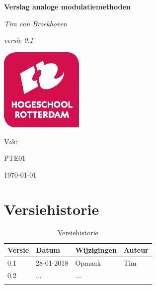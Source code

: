 \documentclass[11pt,a4paper]{article}
\def\auteur{Tim van Broekhoven}
\def\titel{Verslag analoge modulatiemethoden}
\def\datum{\today}
\def\versie{0.1}
\def\subtitel{}
\begin{document}
	
	\begin{titlepage}	
		\centering
		{\huge\bfseries \titel \par}
		{\huge\itshape \subtitel \par}
		\vspace{1cm}
		{\Large\itshape \auteur \par}
		\vspace{1cm}
		{\Large\itshape versie \versie\par}	
		\vfill
		\includegraphics[width=0.30\textwidth]{hr-logo}\par\vspace{1cm}
		Vak:\par
		PTE01
		
		\vfill
		{\large \datum \par}
	\end{titlepage}
	
	\tableofcontents
	
	\clearpage
	
	\listoffigures
	
	\clearpage
	\listoftables
	
	\clearpage
	
	\section{Versiehistorie}
	\begin{table}[H]
		\centering
		\label{Versiehistorie}
		\begin{tabular}{|p{1cm}|p{2cm}|p{6cm}|p{2cm}|}
			\hline
			\rowcolor[HTML]{FFCC67}
			\textbf{Versie} & \textbf{Datum} & \textbf{Wijzigingen} & \textbf{Auteur} \\ \hline
			0.1    & 28-01-2018 & Opmaak    & Tim \\ \hline
			0.2	   & ...		& ...  	&  \\ \hline
			&       &             &        \\ \hline
		\end{tabular}
		\caption {Versiehistorie} \label{tab:title} 
	\end{table}	
\end{document}
